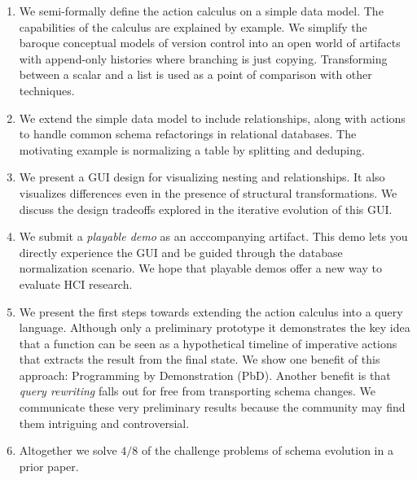 \documentclass[english,submission]{programming}
\theoremstyle{definition}
\begin{document}
\begin{enumerate}

  \item We semi-formally define the action calculus on a simple data model. The capabilities of the calculus are explained by example. We simplify the baroque conceptual models of version control into an open world of artifacts with append-only histories where branching is just copying. Transforming between a scalar and a list is used as a point of comparison with other techniques.

  \item We extend the simple data model to include relationships, along with actions to handle common schema refactorings in relational databases. The motivating example is normalizing a table by splitting and deduping.

  \item We present a GUI design for visualizing nesting and relationships. It also visualizes differences even in the presence of structural transformations. We discuss the design tradeoffs explored in the iterative evolution of this GUI.

  \item We submit a \textit{playable demo} as an acccompanying artifact. This demo lets you directly experience the GUI and be guided through the database normalization scenario. We hope that playable demos offer a new way to evaluate HCI research.

  \item We present the first steps towards extending the action calculus into a query language. Although only a preliminary prototype it demonstrates the key idea that a function can be seen as a hypothetical timeline of imperative actions that extracts the result from the final state. We show one benefit of this approach: Programming by Demonstration (PbD). Another benefit is that \textit{query rewriting} falls out for free from transporting schema changes. We communicate these very preliminary results because the community may find them intriguing and controversial.

  \item Altogether we solve $4/8$ of the challenge problems of schema evolution in a prior paper\cite{challenge-problems}.

\end{enumerate}
\end{document}
